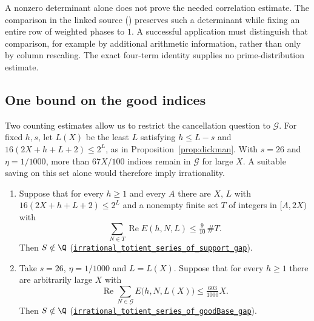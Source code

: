 A nonzero determinant alone does not prove the needed correlation
estimate. The comparison in the linked source
()
preserves such a determinant
while fixing an entire row of weighted phases to $1$. A successful
application must distinguish that comparison, for example by additional
arithmetic information, rather than only by column rescaling. The exact
four-term identity supplies no prime-distribution estimate.

\subsection{One bound on the good indices}\label{sub:goodbasegap}

Two counting estimates allow us to restrict the cancellation question
to $\mathcal G$. For fixed $h,s$, let $L(X)$ be the least $L$ satisfying
$h\le L-s$ and $16(2X+h+L+2)\le2^L$, as in
Proposition~\ref{prop:dickman}. With $s=26$ and $\eta=1/1000$, more
than $67X/100$ indices remain in $\mathcal G$ for large $X$.
A suitable saving on this set alone would therefore imply irrationality.

\begin{thm}
\label{thm:goodbasegap}
\begin{enumerate}[label=(\alph*),leftmargin=*]
\item Suppose that for every $h\ge1$ and every $A$ there are $X$, $L$ with
  $16(2X+h+L+2)\le2^L$ and a nonempty finite set $T$ of integers in
  $[A,2X)$ with
  \[
   \sum_{N\in T}\operatorname{Re}E(h,N,L)\le\tfrac{9}{10}\,\#T.
  \]
  Then $S\notin\Q$
  (\href{https://github.com/wcook04/plectis-erdos/blob/24edbddbe2bd68e920327a701aad0b9dd0d69675/lean/ErdosProblems/ArgumentGraph/Results/Erdos249Endpoint.lean\#L44}{\texttt{irrational\_totient\_series\_of\_support\_gap}}).
\item Take $s=26$, $\eta=1/1000$ and $L=L(X)$. Suppose that for every
  $h\ge1$ there are arbitrarily large $X$ with
  \[
   \operatorname{Re}\sum_{N\in\mathcal G}E\bigl(h,N,L(X)\bigr)
   \le\tfrac{603}{1000}X.
  \]
  Then $S\notin\Q$
  (\href{https://github.com/wcook04/plectis-erdos/blob/24edbddbe2bd68e920327a701aad0b9dd0d69675/lean/ErdosProblems/ArgumentGraph/Results/Erdos249Endpoint.lean\#L100}{\texttt{irrational\_totient\_series\_of\_goodBase\_gap}}).
\end{enumerate}
\end{thm}

